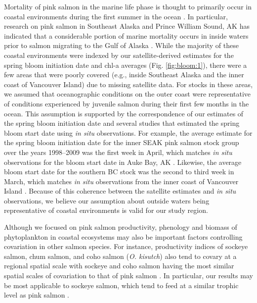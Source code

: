 Mortality of pink salmon in the marine life phase is thought to primarily occur
in coastal environments during the first summer in the ocean \citep{Farley2007a,
Parker1968a, Wertheimer2007a}. In particular, research on pink salmon in
Southeast Alaska and Prince William Sound, AK has indicated that a considerable
portion of marine mortality occurs in inside waters prior to salmon migrating to
the Gulf of Alaska \citep{Orsi2013, Farley2007a}. While the majority of these
coastal environments were indexed by our satellite-derived estimates for the
spring bloom initiation date and chl-a averages (Fig. \ref{fig:bloom:1}), there
were a few areas that were poorly covered (e.g., inside Southeast Alaska and the
inner coast of Vancouver Island) due to missing satellite data. For stocks in
these areas, we assumed that oceanographic conditions on the outer coast were
representative of conditions experienced by juvenile salmon during their first
few months in the ocean. This assumption is supported by the correspondence of
our estimates of the spring bloom initiation date and several studies that
estimated the spring bloom start date using \emph{in situ} observations. For
example, the average estimate for the spring bloom initiation date for the inner
SEAK pink salmon stock group over the years 1998--2009 was the first week in
April, which matches \emph{in situ} observations for the bloom start date in
Auke Bay, AK \citep{Ziemann1991}. Likewise, the average bloom start date for the
southern BC stock was the second to third week in March, which matches \emph{in
situ} observations from the inner coast of Vancouver Island
\citep{Chittenden2010a}.  Because of this coherence between the satellite
estimates and \emph{in situ} observations, we believe our assumption about
outside waters being representative of coastal environments is valid for our
study region.

Although we focused on pink salmon productivity, phenology and biomass of
phytoplankton in coastal ecosystems may also be important factors controlling
covariation in other salmon species. For instance, productivity indices of
sockeye salmon, chum salmon, and coho salmon (\emph{O. kisutch}) also tend to
covary at a regional spatial scale with sockeye and coho salmon having the most
similar spatial scales of covariation to that of pink salmon \citep{Mueter2002b,
Teo2009a, Peterman2012}. In particular, our results may be most applicable to
sockeye salmon, which tend to feed at a similar trophic level as pink salmon
\citep{Johnson2009a}.

